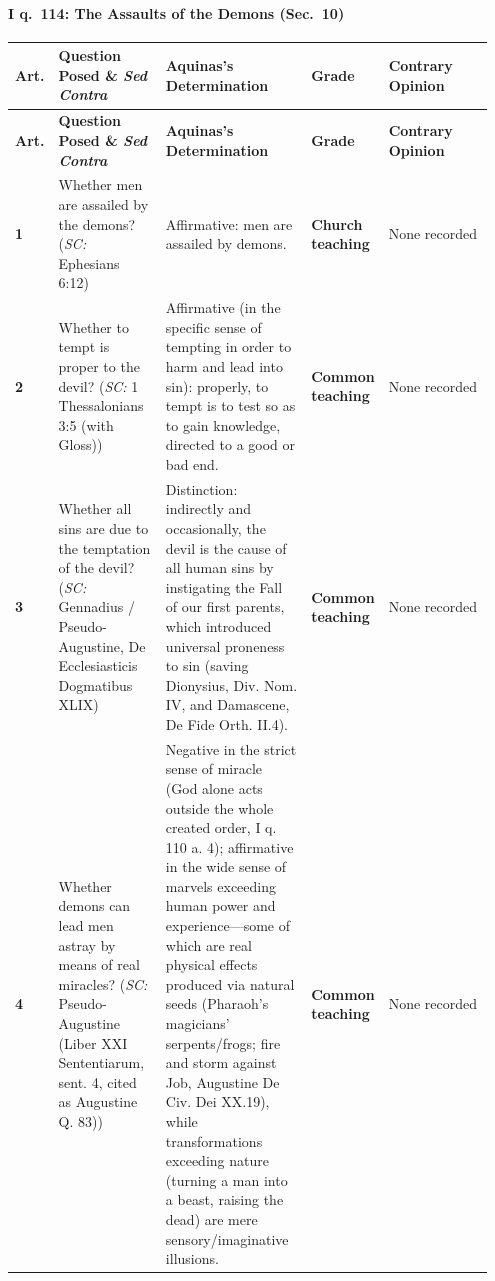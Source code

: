\paragraph{I q.~114: The Assaults of the Demons (Sec.~10)}
{\scriptsize
\setlength{\tabcolsep}{2.5pt}
\renewcommand{\arraystretch}{1.15}
\begin{longtable}{>{\raggedright\arraybackslash}p{0.05\linewidth}>{\raggedright\arraybackslash}p{0.23\linewidth}>{\raggedright\arraybackslash}p{0.31\linewidth}>{\raggedright\arraybackslash}p{0.12\linewidth}>{\raggedright\arraybackslash}p{0.24\linewidth}}
\toprule
\textbf{Art.} & \textbf{Question Posed \& \emph{Sed Contra}} & \textbf{Aquinas's Determination} & \textbf{Grade} & \textbf{Contrary Opinion} \\
\midrule
\endfirsthead
\toprule
\textbf{Art.} & \textbf{Question Posed \& \emph{Sed Contra}} & \textbf{Aquinas's Determination} & \textbf{Grade} & \textbf{Contrary Opinion} \\
\midrule
\endhead
\bottomrule
\endfoot
\textbf{1} & Whether men are assailed by the demons? (\emph{SC:} Ephesians 6:12) & Affirmative: men are assailed by demons. & \textbf{Church teaching} & None recorded \\
\addlinespace[1.5pt]
\textbf{2} & Whether to tempt is proper to the devil? (\emph{SC:} 1 Thessalonians 3:5 (with Gloss)) & Affirmative (in the specific sense of tempting in order to harm and lead into sin): properly, to tempt is to test so as to gain knowledge, directed to a good or bad end. & \textbf{Common teaching} & None recorded \\
\addlinespace[1.5pt]
\textbf{3} & Whether all sins are due to the temptation of the devil? (\emph{SC:} Gennadius / Pseudo-Augustine, De Ecclesiasticis Dogmatibus XLIX) & Distinction: indirectly and occasionally, the devil is the cause of all human sins by instigating the Fall of our first parents, which introduced universal proneness to sin (saving Dionysius, Div. Nom. IV, and Damascene, De Fide Orth. II.4). & \textbf{Common teaching} & None recorded \\
\addlinespace[1.5pt]
\textbf{4} & Whether demons can lead men astray by means of real miracles? (\emph{SC:} Pseudo-Augustine (Liber XXI Sententiarum, sent. 4, cited as Augustine Q. 83)) & Negative in the strict sense of miracle (God alone acts outside the whole created order, I q. 110 a. 4); affirmative in the wide sense of marvels exceeding human power and experience---some of which are real physical effects produced via natural seeds (Pharaoh's magicians' serpents/frogs; fire and storm against Job, Augustine De Civ. Dei XX.19), while transformations exceeding nature (turning a man into a beast, raising the dead) are mere sensory/imaginative illusions. & \textbf{Common teaching} & None recorded \\

\end{longtable}}
